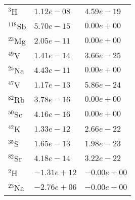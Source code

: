 \begin{tabular}{lll}
 $^{3}$H    & $1.12e-08 $                                                        & $4.59e-19 $                                                                     \\
 $^{118}$Sb & $5.70e-15 $                                                        & $0.00e+00 $                                                                     \\
 $^{23}$Mg  & $2.05e-11 $                                                        & $0.00e+00 $                                                                     \\
 $^{49}$V   & $1.41e-14 $                                                        & $3.66e-25 $                                                                     \\
 $^{25}$Na  & $4.43e-11 $                                                        & $0.00e+00 $                                                                     \\
 $^{47}$V   & $1.17e-13 $                                                        & $5.86e-24 $                                                                     \\
 $^{82}$Rb  & $3.78e-16 $                                                        & $0.00e+00 $                                                                     \\
 $^{50}$Sc  & $4.16e-16 $                                                        & $0.00e+00 $                                                                     \\
 $^{42}$K   & $1.33e-12 $                                                        & $2.66e-22 $                                                                     \\
 $^{35}$S   & $1.65e-13 $                                                        & $1.98e-23 $                                                                     \\
 $^{82}$Sr  & $4.18e-14 $                                                        & $3.22e-22 $                                                                     \\
 $^{2}$H    & $-1.31e+12 $                                                       & $-0.00e+00 $                                                                    \\
 $^{23}$Na  & $-2.76e+06 $                                                       & $-0.00e+00 $                                                                    \\

\end{tabular}
